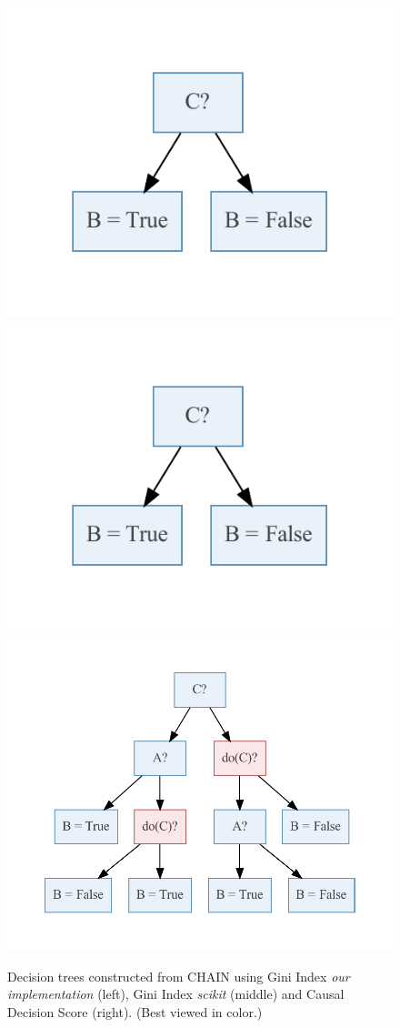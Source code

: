 \documentclass{article}
\begin{document}
\begin{figure}[h]
\centering
\includegraphics[width=0.32\linewidth]{./dts/chain_gini_corr_606.pdf}
\includegraphics[width=0.32\linewidth]{./dts/chain_gini_scikit_corr_606.pdf}
\includegraphics[width=0.32\linewidth]{./dts/chain_cl_606.pdf}

\caption{Decision trees constructed from CHAIN using Gini Index \textit{our implementation} (left), Gini Index \textit{scikit} (middle) and Causal Decision Score (right). (Best viewed in color.)}
\end{figure}
\end{document}
